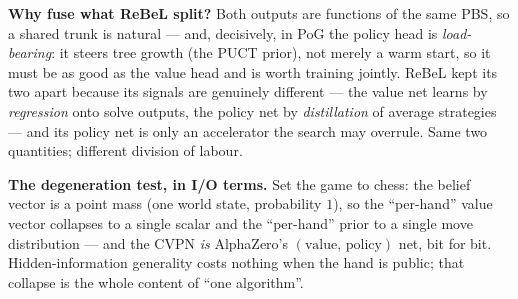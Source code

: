 \documentclass[11pt,a4paper]{article}
\begin{document}
\begin{center}
\end{center}

\textbf{Why fuse what ReBeL split?} Both outputs are functions of the same PBS,
so a shared trunk is natural --- and, decisively, in PoG the policy head is
\emph{load-bearing}: it steers tree growth (the PUCT prior), not merely a warm
start, so it must be as good as the value head and is worth training jointly.
ReBeL kept its two apart because its signals are genuinely different --- the value
net learns by \emph{regression} onto solve outputs, the policy net by
\emph{distillation} of average strategies --- and its policy net is only an
accelerator the search may overrule. Same two quantities; different division of
labour.

\textbf{The degeneration test, in I/O terms.} Set the game to chess: the belief
vector is a point mass (one world state, probability $1$), so the ``per-hand''
value vector collapses to a single scalar and the ``per-hand'' prior to a single
move distribution --- and the CVPN \emph{is} AlphaZero's
$(\text{value},\,\text{policy})$ net, bit for bit. Hidden-information generality
costs nothing when the hand is public; that collapse is the whole content of
``one algorithm''.
\end{document}
